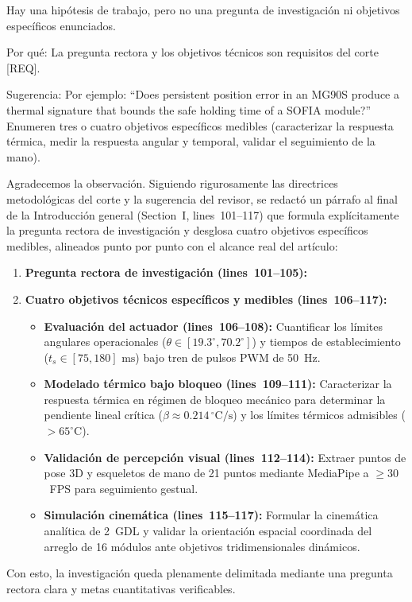 \documentclass{LabDSTresponse}
\begin{document}
{Hay una hipótesis de trabajo, pero no una pregunta de investigación ni objetivos específicos enunciados.

Por qué: La pregunta rectora y los objetivos técnicos son requisitos del corte [REQ].

Sugerencia: Por ejemplo: ``Does persistent position error in an MG90S produce a thermal signature that bounds the safe holding time of a SOFIA module?'' Enumeren tres o cuatro objetivos específicos medibles (caracterizar la respuesta térmica, medir la respuesta angular y temporal, validar el seguimiento de la mano).}
{Agradecemos la observación. Siguiendo rigurosamente las directrices metodológicas del corte y la sugerencia del revisor, se redactó un párrafo al final de la Introducción general (Section~I, lines~101--117) que formula explícitamente la pregunta rectora de investigación y desglosa cuatro objetivos específicos medibles, alineados punto por punto con el alcance real del artículo:
\begin{enumerate}
    \item \textbf{Pregunta rectora de investigación (lines~101--105):}
    \item \textbf{Cuatro objetivos técnicos específicos y medibles (lines~106--117):}
    \begin{itemize}
        \item \textbf{Evaluación del actuador (lines~106--108):} Cuantificar los límites angulares operacionales ($\theta \in [19.3^\circ, 70.2^\circ]$) y tiempos de establecimiento ($t_s \in [75, 180]\text{ ms}$) bajo tren de pulsos PWM de 50~Hz.
        \item \textbf{Modelado térmico bajo bloqueo (lines~109--111):} Caracterizar la respuesta térmica en régimen de bloqueo mecánico para determinar la pendiente lineal crítica ($\beta \approx 0.214\,^\circ\text{C/s}$) y los límites térmicos admisibles ($>65^\circ\text{C}$).
        \item \textbf{Validación de percepción visual (lines~112--114):} Extraer puntos de pose 3D y esqueletos de mano de 21 puntos mediante MediaPipe a $\ge 30$~FPS para seguimiento gestual.
        \item \textbf{Simulación cinemática (lines~115--117):} Formular la cinemática analítica de 2~GDL y validar la orientación espacial coordinada del arreglo de 16 módulos ante objetivos tridimensionales dinámicos.
    \end{itemize}
\end{enumerate}
Con esto, la investigación queda plenamente delimitada mediante una pregunta rectora clara y metas cuantitativas verificables.}
\end{document}
